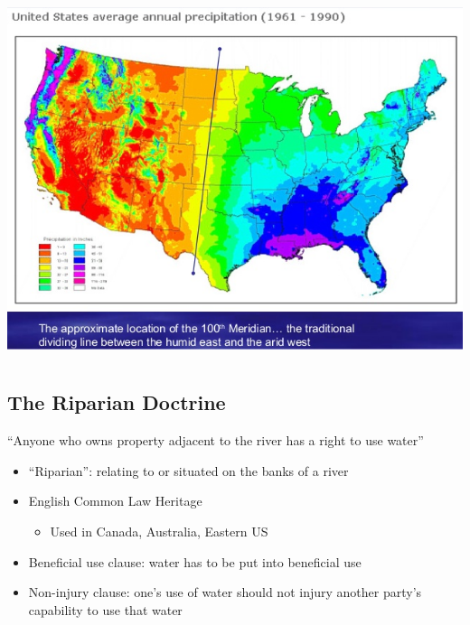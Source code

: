 \documentclass[]{article}
\providecommand{\tightlist}{%
  \setlength{\itemsep}{0pt}\setlength{\parskip}{0pt}}
\begin{document}
\hypertarget{section-30}{%
\subsection{}\label{section-30}}

\includegraphics[width=\textwidth,height=4.16667in]{figures/m10_precipitation.jpg}

\hypertarget{the-riparian-doctrine}{%
\subsection{The Riparian Doctrine}\label{the-riparian-doctrine}}

``Anyone who owns property adjacent to the river has a right to use
water''

\begin{itemize}
\tightlist
\item
  ``Riparian'': relating to or situated on the banks of a river
\item
  English Common Law Heritage

  \begin{itemize}
  \tightlist
  \item
    Used in Canada, Australia, Eastern US
  \end{itemize}
\item
  Beneficial use clause: water has to be put into beneficial use
\item
  Non-injury clause: one's use of water should not injury another
  party's capability to use that water
\end{itemize}
\end{document}
